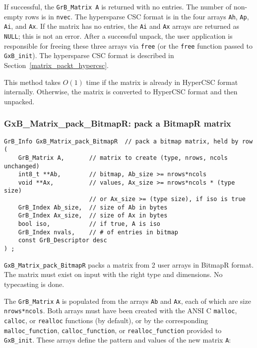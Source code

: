 \documentclass[12pt]{article}
\begin{document}
If successful, the \verb'GrB_Matrix A' is
returned with no entries.
The number of non-empty
rows is in \verb'nvec'.  The hypersparse CSC format is in the four arrays
\verb'Ah', \verb'Ap', \verb'Ai', and \verb'Ax'.  If the matrix has no entries,
the \verb'Ai' and \verb'Ax' arrays are returned as \verb'NULL'; this is not an
error.  After a successful unpack, the user application is responsible for
freeing these three arrays via \verb'free' (or the \verb'free' function passed
to \verb'GxB_init').  The hypersparse CSC format is described in
Section~\ref{matrix_packt_hypercsc}.

This method takes $O(1)$ time if the matrix is already in HyperCSC format
internally.  Otherwise, the matrix is converted to HyperCSC format and then
unpacked.


\newpage
\subsubsection{{\sf GxB\_Matrix\_pack\_BitmapR:} pack a BitmapR matrix}
\label{matrix_pack_bitmapr}

\begin{mdframed}[userdefinedwidth=6in]
{\footnotesize
\begin{verbatim}
GrB_Info GxB_Matrix_pack_BitmapR  // pack a bitmap matrix, held by row
(
    GrB_Matrix A,       // matrix to create (type, nrows, ncols unchanged)
    int8_t **Ab,        // bitmap, Ab_size >= nrows*ncols
    void **Ax,          // values, Ax_size >= nrows*ncols * (type size)
                        // or Ax_size >= (type size), if iso is true
    GrB_Index Ab_size,  // size of Ab in bytes
    GrB_Index Ax_size,  // size of Ax in bytes
    bool iso,           // if true, A is iso
    GrB_Index nvals,    // # of entries in bitmap
    const GrB_Descriptor desc
) ;
\end{verbatim}
} \end{mdframed}

\verb'GxB_Matrix_pack_BitmapR' packs a matrix from 2 user arrays in BitmapR
format.
The matrix must exist on input with the right type and dimensions.  No typecasting is done.

The \verb'GrB_Matrix' \verb'A' is populated from the arrays \verb'Ab' and
\verb'Ax', each of which are size \verb'nrows*ncols'.  Both arrays must have
been created with the ANSI C \verb'malloc', \verb'calloc', or \verb'realloc'
functions (by default), or by the corresponding \verb'malloc_function',
\verb'calloc_function', or \verb'realloc_function' provided to \verb'GxB_init'.
These arrays define the pattern and values of the new matrix \verb'A':
\end{document}

